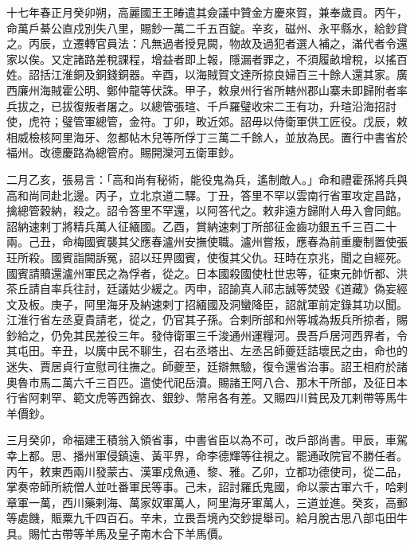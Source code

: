 
\begin{pinyinscope}

 十七年春正月癸卯朔，高麗國王王睶遣其僉議中贊金方慶來賀，兼奉歲貢。丙午，命萬戶綦公直戍別失八里，賜鈔一萬二千五百錠。辛亥，磁州、永平縣水，給鈔貸之。丙辰，立遷轉官員法：凡無過者授見闕，物故及過犯者選人補之，滿代者令還家以俟。又定諸路差稅課程，增益者即上報，隱漏者罪之，不須履畝增稅，以搖百姓。詔括江淮銅及銅錢銅器。辛酉，以海賊賀文達所掠良婦百三十餘人還其家。廣西廉州海賊霍公明、鄭仲龍等伏誅。甲子，敕泉州行省所轄州郡山寨未即歸附者率兵拔之，已拔復叛者屠之。以總管張瑄、千戶羅璧收宋二王有功，升瑄沿海招討使，虎符；璧管軍總管，金符。丁卯，畋近郊。詔毋以侍衛軍供工匠役。戊辰，敕相威檢核阿里海牙、忽都帖木兒等所俘丁三萬二千餘人，並放為民。置行中書省於福州。改德慶路為總管府。賜開灤河五衛軍鈔。



 二月乙亥，張易言：「高和尚有秘術，能役鬼為兵，遙制敵人。」命和禮霍孫將兵與高和尚同赴北邊。丙子，立北京道二驛。丁丑，答里不罕以雲南行省軍攻定昌路，擒總管穀納，殺之。詔令答里不罕還，以阿答代之。敕非遠方歸附人毋入會同館。詔納速剌丁將精兵萬人征緬國。乙酉，賞納速剌丁所部征金齒功銀五千三百二十兩。己丑，命梅國賓襲其父應春瀘州安撫使職。瀘州嘗叛，應春為前重慶制置使張玨所殺。國賓詣闕訴冤，詔以玨畀國賓，使復其父仇。玨時在京兆，聞之自經死。國賓請贖還瀘州軍民之為俘者，從之。日本國殺國使杜世忠等，征東元帥忻都、洪茶丘請自率兵往討，廷議姑少緩之。丙申，詔諭真人祁志誠等焚毀《道藏》偽妄經文及板。庚子，阿里海牙及納速剌丁招緬國及洞蠻降臣，詔就軍前定錄其功以聞。江淮行省左丞夏貴請老，從之，仍官其子孫。合剌所部和州等城為叛兵所掠者，賜鈔給之，仍免其民差役三年。發侍衛軍三千浚通州運糧河。畏吾戶居河西界者，令其屯田。辛丑，以廣中民不聊生，召右丞塔出、左丞呂師夔廷詰壞民之由，命也的迷失、賈居貞行宣慰司往撫之。師夔至，廷辯無驗，復令還省治事。詔王相府於諸奧魯市馬二萬六千三百匹。遣使代祀岳瀆。賜諸王阿八合、那木干所部，及征日本行省阿剌罕、範文虎等西錦衣、銀鈔、幣帛各有差。又賜四川貧民及兀剌帶等馬牛羊價鈔。



 三月癸卯，命福建王積翁入領省事，中書省臣以為不可，改戶部尚書。甲辰，車駕幸上都。思、播州軍侵鎮遠、黃平界，命李德輝等往視之。罷通政院官不勝任者。丙午，敕東西兩川發蒙古、漢軍戍魚通、黎、雅。乙卯，立都功德使司，從二品，掌奏帝師所統僧人並吐番軍民等事。己未，詔討羅氏鬼國，命以蒙古軍六千，哈剌章軍一萬，西川藥剌海、萬家奴軍萬人，阿里海牙軍萬人，三道並進。癸亥，高郵等處饑，賑粟九千四百石。辛未，立畏吾境內交鈔提舉司。給月脫古思八部屯田牛具。賜忙古帶等羊馬及皇子南木合下羊馬價。




\end{pinyinscope}
